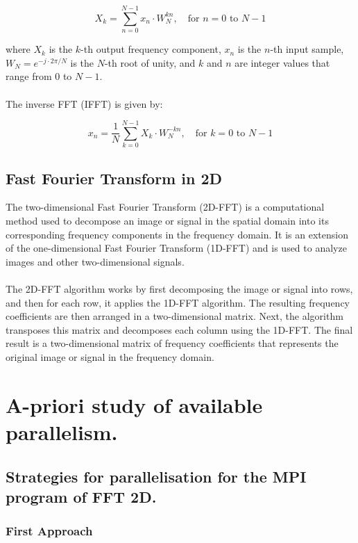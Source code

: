 \documentclass{article}
\begin{document}
\begin{equation*}
X_k = \sum_{n=0}^{N-1} x_n \cdot W_N^{kn}, \quad \text{for } n = 0 \text{ to } N-1
\end{equation*}

where $X_k$ is the $k$-th output frequency component, $x_n$ is the $n$-th input sample, $W_N = e^{-j \cdot 2 \pi / N}$ is the $N$-th root of unity, and $k$ and $n$ are integer values that range from 0 to $N-1$.
\\\\
The inverse FFT (IFFT) is given by:

\begin{equation*}
x_n = \frac{1}{N} \sum_{k=0}^{N-1} X_k \cdot W_N^{-kn}, \quad \text{for } k = 0 \text{ to } N-1
\end{equation*}

\subsection{Fast Fourier Transform in 2D}

The two-dimensional Fast Fourier Transform (2D-FFT) is a computational method used to decompose an image or signal in the spatial domain into its corresponding frequency components in the frequency domain. It is an extension of the one-dimensional Fast Fourier Transform (1D-FFT) and is used to analyze images and other two-dimensional signals.
\\\\
The 2D-FFT algorithm works by first decomposing the image or signal into rows, and then for each row, it applies the 1D-FFT algorithm. The resulting frequency coefficients are then arranged in a two-dimensional matrix. Next, the algorithm transposes this matrix and decomposes each column using the 1D-FFT. The final result is a two-dimensional matrix of frequency coefficients that represents the original image or signal in the frequency domain.

\section{A-priori study of available parallelism.}
\subsection{Strategies for parallelisation for the MPI program of FFT 2D.}

\subsubsection{First Approach}
\end{document}
